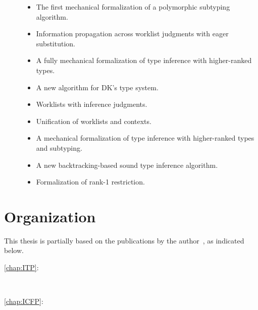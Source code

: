 \begin{description}
\item[]
  \begin{itemize}
  \item The first mechanical formalization of a polymorphic subtyping algorithm.
  \item Information propagation across worklist judgments with eager substitution.
  \end{itemize}
\item[]
  \begin{itemize}
  \item A fully mechanical formalization of type inference with higher-ranked types.
  \item A new algorithm for DK's type system.
  \item Worklists with inference judgments.
  \item Unification of worklists and contexts.
  \end{itemize}
\item[]
  \begin{itemize}
  \item A mechanical formalization of type inference with higher-ranked types and subtyping.
  \item A new backtracking-based sound type inference algorithm.
  \item Formalization of rank-1 restriction.
  \end{itemize}
\end{description}


\section{Organization}

This thesis is partially based on the publications by the author~\citep{},
as indicated below.
\begin{description}
\item[\cref{chap:ITP}:]~
\item[\cref{chap:ICFP}:]~
\end{description}


\noindent\makebox[\linewidth]{\rule{0.7\textwidth}{0.4pt}}

\vspace{1.5\baselineskip}








